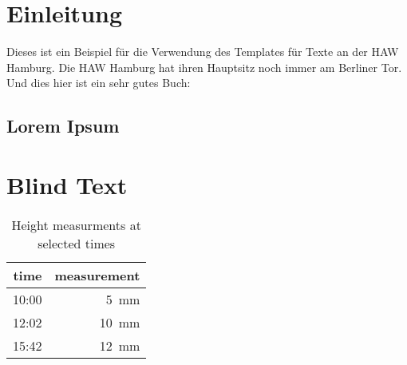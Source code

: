 %

\section{Einleitung}
Dieses ist ein Beispiel für die Verwendung des Templates für Texte an der HAW Hamburg.
Die HAW Hamburg hat ihren Hauptsitz noch immer am Berliner Tor.
Und dies hier ist ein sehr gutes Buch: \cite{adams1995douglas}

\subsection{Lorem Ipsum}
\lipsum

\section{Blind Text}
\blindtext


\blindmathtrue
\blindmathfalse

\begin{table}[ht]
  \caption{Height measurments at selected times}\label{table:measurements}
  \begin{center}
    \begin{tabular}{r|r}
      time & measurement\\
      \hline
      10:00 &  5~mm\\
      12:02 & 10~mm\\
      15:42 & 12~mm\\
    \end{tabular}
  \end{center}
\end{table}

\lipsum
